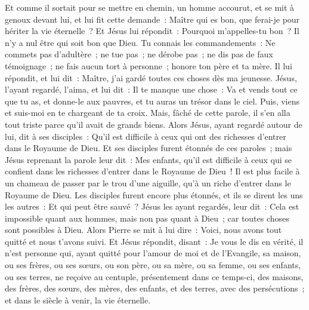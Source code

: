 \begin{multicols}{2}
Et comme il sortait pour se mettre en chemin, un homme accourut, et se mit à genoux devant lui, et lui fit cette demande~: Maître qui es bon, que ferai-je pour hériter la vie éternelle~?
Et Jésus lui répondit~: Pourquoi m'appelles-tu bon~? Il n'y a nul être qui soit bon que Dieu.
Tu connais les commandements~: Ne commets pas d'adultère~; ne tue pas~; ne dérobe pas~; ne dis pas de faux témoignage~; ne fais aucun tort à personne~; honore ton père et ta mère.
Il lui répondit, et lui dit~: Maître, j'ai gardé toutes ces choses dès ma jeunesse.
Jésus, l'ayant regardé, l'aima, et lui dit~: Il te manque une chose~: Va et vends tout ce que tu as, et donne-le aux pauvres, et tu auras un trésor dans le ciel. Puis, viens et suis-moi en te chargeant de ta croix.
Mais, fâché de cette parole, il s'en alla tout triste parce qu'il avait de grands biens.
Alors Jésus, ayant regardé autour de lui, dit à ses disciples~: Qu'il est difficile à ceux qui ont des richesses d'entrer dans le Royaume de Dieu.
Et ses disciples furent étonnés de ces paroles~; mais Jésus reprenant la parole leur dit~: Mes enfants, qu'il est difficile à ceux qui se confient dans les richesses d'entrer dans le Royaume de Dieu~!
Il est plus facile à un chameau de passer par le trou d'une aiguille, qu'à un riche d'entrer dans le Royaume de Dieu.
Les disciples furent encore plus étonnés, et ils se dirent les uns les autres~: Et qui peut être sauvé~?
Jésus les ayant regardés, leur dit~: Cela est impossible quant aux hommes, mais non pas quant à Dieu~; car toutes choses sont possibles à Dieu.
Alors Pierre se mit à lui dire~: Voici, nous avons tout quitté et nous t'avons suivi.
Et Jésus répondit, disant~: Je vous le dis en vérité, il n'est personne qui, ayant quitté pour l'amour de moi et de l'Evangile, sa maison, ou ses frères, ou ses sœurs, ou son père, ou sa mère, ou sa femme, ou ses enfants, ou ses terres,
ne reçoive au centuple, présentement dans ce temps-ci, des maisons, des frères, des sœurs, des mères, des enfants, et des terres, avec des persécutions~; et dans le siècle à venir, la vie éternelle.

\end{multicols}

